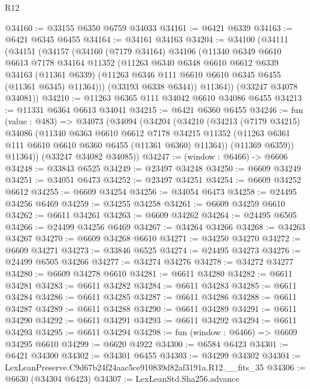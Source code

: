 \begin{lexlean}{R12}
\begin{coremodule}
@34160 := @33155 @6350 @6759 @34033
@34161 := @6421 @6339
@34163 := @6421 @6345 @6455
@34164 := @34161 @34163
@34204 := @34100
    (@34111
      (@34151
        (@34157
          (@34160
            (@7179 @34164)
            @34106
            (@11340
              @6349
              @6610
              @6613
              @7178
              @34164
              @11352
              (@11263
                @6340
                @6348
                @6610
                @6612
                @6339
                @34163
                (@11361 @6339)
                (@11263 @6346 @111 @6610 @6610 @6345 @6455 (@11361 @6345) @11364)))
            (@33193 @6338 @6344))
          @11364))
      (@33247 @34078 @34081))
@34210 := @11263 @6365 @111 @34042 @6610 @34086 @6455
@34213 := @11331 @6364 @6613 @34041
@34215 := @6421 @6360 @6455
@34246 := fun (value : @483) =>
  @34073
    (@34094
      (@34204
        (@34210
          (@34213
            (@7179 @34215)
            @34086
            (@11340
              @6363
              @6610
              @6612
              @7178
              @34215
              @11352
              (@11263 @6361 @111 @6610 @6610 @6360 @6455 (@11361 @6360) @11364))
            (@11369 @6359))
          @11364))
      (@33247 @34082 @34085))
@34247 := (window : @6466) -> @6606
@34248 := @33843 @6525
@34249 := @23497 @34248
@34250 := @6609 @34249
@34251 := @34051 @6473
@34252 := @23497 @34251
@34254 := @6609 @34252 @6612
@34255 := @6609 @34254
@34256 := @34054 @6473
@34258 := @24495 @34256 @6469
@34259 := @34255 @34258
@34261 := @6609 @34259 @6610
@34262 := @6611 @34261
@34263 := @6609 @34262
@34264 := @24495 @6505
@34266 := @24499 @34256 @6469
@34267 := @34264 @34266
@34268 := @34263 @34267
@34270 := @6609 @34268 @6610
@34271 := @34250 @34270
@34272 := @6609 @34271
@34273 := @33846 @6525
@34274 := @24495 @34273
@34276 := @24499 @6505 @34266
@34277 := @34274 @34276
@34278 := @34272 @34277
@34280 := @6609 @34278 @6610
@34281 := @6611 @34280
@34282 := @6611 @34281
@34283 := @6611 @34282
@34284 := @6611 @34283
@34285 := @6611 @34284
@34286 := @6611 @34285
@34287 := @6611 @34286
@34288 := @6611 @34287
@34289 := @6611 @34288
@34290 := @6611 @34289
@34291 := @6611 @34290
@34292 := @6611 @34291
@34293 := @6611 @34292
@34294 := @6611 @34293
@34295 := @6611 @34294
@34298 := fun (window : @6466) => @6609 @34295 @6610
@34299 := @6620 @4922
@34300 := @6584 @6423
@34301 := @6421 @34300
@34302 := @34301 @6455
@34303 := @34299 @34302
@34304 := LexLeanPreserve.C9d67b24f24aac5ce910839d82af3191a.R12.__fits_35
@34306 := @6630 (@34304 @6423)
@34307 := LexLeanStd.Sha256.advance

\end{coremodule}
\end{lexlean}

